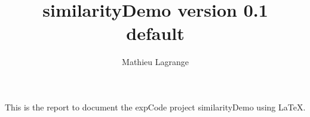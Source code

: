 \documentclass[10pt,a4paper,fleqn]{article}
\title{similarityDemo version 0.1\\ default}
\author{ Mathieu Lagrange }
\begin{document}
 
  
\maketitle 
  
  
This is the report to document the expCode project similarityDemo using \LaTeX. 
  
  
  
% 
% 
  
\end{document}
